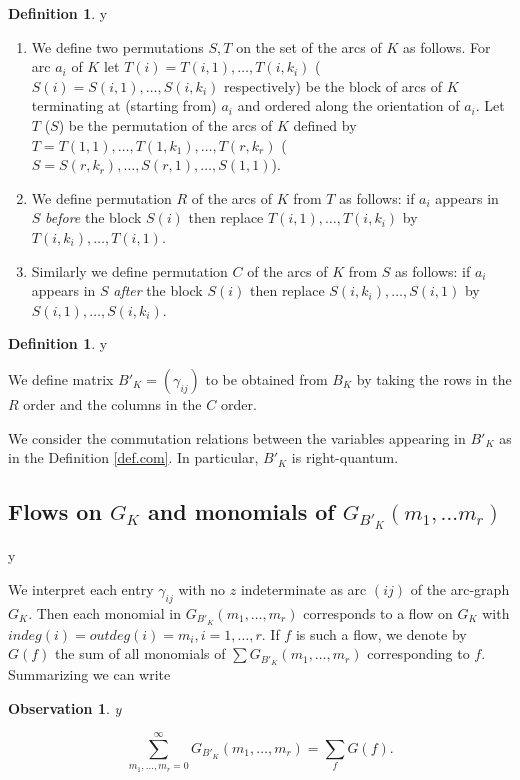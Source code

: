 \documentclass{amsart}
\theoremstyle{plain}
\newtheorem{observation}{Observation}
\theoremstyle{definition}
\newtheorem{definition}[proposition]{Definition}
\theoremstyle{remark}
\def\printname#1{
        \if\draft y
                \smash{\makebox[0pt]{\hspace{-0.5in}
                        \raisebox{8pt}{\tt\tiny #1}}}
        \fi
}
\def\lbl#1{\label{#1}\printname{#1}}
\def\sign{\mathrm{sign}}
\begin{document}
\begin{definition}
\lbl{def.perm}
\begin{enumerate}
\item
We define two permutations $S,T$ on the set of the arcs of $K$ as follows.
For arc $a_i$ of $K$ let $T(i)= T(i,1),\dots, T(i,k_i)$ 
( $S(i)= S(i,1),\dots, S(i,k_i)$ respectively)
be the block of arcs of $K$ terminating at (starting from) $a_i$ and 
ordered along
the orientation of $a_i$. Let $T$ ($S$) be the permutation of the arcs of $K$
defined by $T= T(1,1),\dots, T(1,k_1),\dots, T(r,k_r)$ 
($S= S(r,k_r),\dots, S(r,1),\dots, S(1,1)$).
\item
We define permutation $R$ of the arcs of $K$ from $T$ as follows:
if $a_i$ appears in $S$ {\it before} the block $S(i)$ then 
replace $T(i,1),\dots, T(i,k_i)$ by $T(i,k_i),\dots, T(i,1)$.
\item
Similarly we define permutation $C$ of the arcs of $K$ from $S$ as follows:
if $a_i$ appears in $S$ {\it after} the block $S(i)$ then 
replace $S(i,k_i),\dots, S(i,1)$ by $S(i,1),\dots, S(i,k_i)$.
\end{enumerate}
\end{definition}

\begin{definition}
\lbl{def.b'}
We define matrix $B'_K= (\gamma_{ij})$ to be obtained from $B_K$ by 
taking the rows in the $R$ order
and the columns in the $C$ order.
\end{definition}

We consider the commutation relations between the variables appearing in 
$B'_K$ as 
in the Definition \ref{def.com}. In particular, $B'_K$ is right-quantum.


\subsection{Flows on $G_K$ and monomials of $G_{B'_K}(m_1,\dots m_r)$}
\lbl{sub.mon}

We interpret each entry $\gamma_{ij}$ with no $z$ indeterminate as arc 
$(ij)$ of the arc-graph $G_K$.
Then each monomial in $G_{B'_K}(m_1,\dots, m_r)$ corresponds to a flow on 
$G_K$
with $indeg(i)= outdeg(i) = m_i, i=1,\dots, r$. If $f$ is such a flow, we 
denote by $G(f)$
the sum of all monomials of $\sum G_{B'_K}(m_1,\dots, m_r)$ corresponding to 
$f$. Summarizing we can write
 
\begin{observation}
\lbl{obs.fl}
$$
\sum_{m_1,\dots, m_r=0}^{\infty} G_{B'_K}(m_1,\dots, m_r)= \sum_f G(f).
$$
\end{observation}
\end{document}
